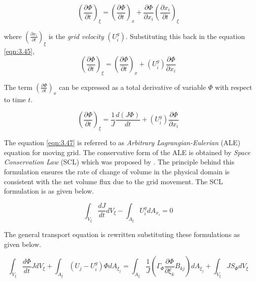 \begin{equation}
\left(\frac{\partial \Phi}{\partial t}\right)_{\xi} = \left(\frac{\partial \Phi}{\partial t}\right)_{x} + \frac{\partial \Phi}{\partial x_i} \left(\frac{\partial x_i}{\partial t}\right)_{\xi}
\label{eqn:3.45}
\end{equation}

where $\left(\frac{\partial x_i}{\partial t}\right)_{\xi}$ is the \textit{grid velocity} $\left(U_{i}^{g} \right)$. Substituting this back in the equation \ref{eqn:3.45},
\begin{equation}
\left(\frac{\partial \Phi}{\partial t}\right)_{\xi} = \left(\frac{\partial \Phi}{\partial t}\right)_{x} + \left(U_{i}^{g} \right) \frac{\partial \Phi}{\partial x_i}
\label{eqn:3.46} 
\end{equation}

The term $ \left(\frac{\partial \Phi}{\partial t}\right)_{x}$ can be expressed as a total derivative of variable $\Phi$ with respect to time $t$.

\begin{equation}
\left(\frac{\partial \Phi}{\partial t}\right)_{\xi} = \frac{1}{J} \frac{d\left(J \Phi\right)}{dt} + \left(U_{i}^{g} \right) \frac{\partial \Phi}{\partial x_i}
\label{eqn:3.47} 
\end{equation}

The equation \ref{eqn:3.47} is referred to as \textit{Arbitrary Lagrangian-Eulerian} (ALE) equation for moving grid. The conservative form of the ALE is obtained by \textit{Space Conservation Law} (SCL) which was proposed by \citet{demirdvzic1988space}. The principle behind this formulation ensures the rate of change of volume in the physical domain is consistent with the net volume flux due to the grid movement. The SCL formulation is as given below.

\begin{equation}
\int_{V_{\xi}} \frac{dJ}{dt}dV_{\xi}-\int_{A_{\xi}} U_{i}^{g} dA_{x_{i}} = 0
\label{eqn:3.48} 
\end{equation}

The general transport equation is rewritten substituting these formulations as given below.

\begin{equation}
\int_{V_{\xi}} \frac{d \Phi}{dt}J dV_{\xi} + \int_{A_{\xi}} \left(U_j-U_{i}^{g}\right) \Phi dA_{{\xi}_j} = \int_{A_{\xi}} \frac{1}{J} \left(\Gamma_{\Phi} \frac{\partial \Phi}{\partial \xi_k} B_{kj} \right) dA_{{\xi}_j} + \int_{V_{\xi}} JS_{\Phi} dV_{\xi}
\label{eqn:3.49} 
\end{equation}

